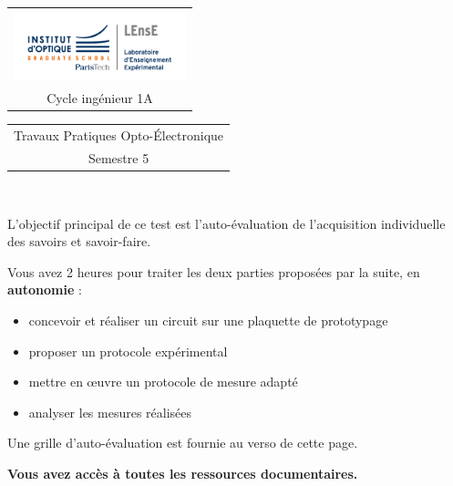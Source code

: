 \Large 
\begin{tabular}{c}
\includegraphics[width=5cm]{logoLEnsE.png}\\
Cycle ingénieur 1A
\end{tabular}
\hfill
\begin{tabular}{c}
Travaux Pratiques Opto-Électronique \\
Semestre 5 \\
\end{tabular}\\
\normalsize 

\bigskip

\begin{mdframed}[style=aavbox,frametitle={Test individuel}]
	
L'objectif principal de ce test est l'auto-évaluation de l'acquisition individuelle des savoirs et savoir-faire.

Vous avez 2 heures pour traiter les deux parties proposées par la suite, en \textbf{autonomie} :
\begin{itemize}
	\item concevoir et réaliser un circuit sur une plaquette de prototypage
	\item proposer un protocole expérimental
	\item mettre en \oe{}uvre un protocole de mesure adapté
	\item analyser les mesures réalisées
\end{itemize}

Une grille d'auto-évaluation est fournie au verso de cette page. 

\textbf{Vous avez accès à toutes les ressources documentaires.}
\end{mdframed}	

\medskip